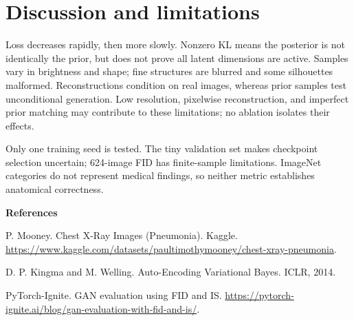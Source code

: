 \documentclass{article}
\begin{document}
\section{Discussion and limitations}
Loss decreases rapidly, then more slowly. Nonzero KL means the posterior is not identically the prior, but does not prove all latent dimensions are active. Samples vary in brightness and shape; fine structures are blurred and some silhouettes malformed. Reconstructions condition on real images, whereas prior samples test unconditional generation. Low resolution, pixelwise reconstruction, and imperfect prior matching may contribute to these limitations; no ablation isolates their effects.

Only one training seed is tested. The tiny validation set makes checkpoint selection uncertain; 624-image FID has finite-sample limitations. ImageNet categories do not represent medical findings, so neither metric establishes anatomical correctness.

\small
\noindent\textbf{References}\par
\noindent [1] P. Mooney. Chest X-Ray Images (Pneumonia). Kaggle. \url{https://www.kaggle.com/datasets/paultimothymooney/chest-xray-pneumonia}.\par
\noindent [2] D. P. Kingma and M. Welling. Auto-Encoding Variational Bayes. ICLR, 2014.\par
\noindent [3] PyTorch-Ignite. GAN evaluation using FID and IS. \url{https://pytorch-ignite.ai/blog/gan-evaluation-with-fid-and-is/}.
\end{document}
